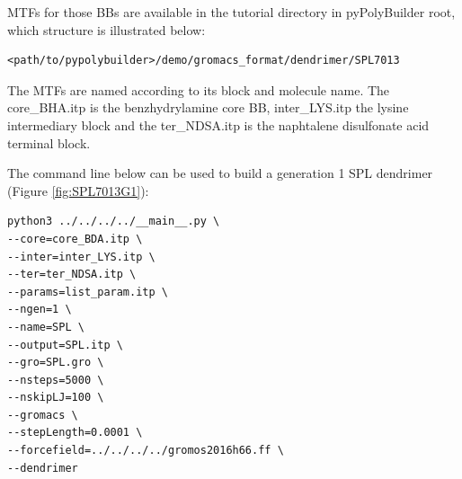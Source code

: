MTFs for those BBs are available in the tutorial directory in pyPolyBuilder root, which structure is illustrated below:
\begin{lstlisting}
<path/to/pypolybuilder>/demo/gromacs_format/dendrimer/SPL7013
\end{lstlisting}

The MTFs are named according to its block and molecule name.
The core\_BHA.itp is the benzhydrylamine core BB, inter\_LYS.itp the lysine intermediary block and the ter\_NDSA.itp is the naphtalene disulfonate acid terminal block.

The command line below can be used to build a generation 1 SPL dendrimer (Figure \ref{fig:SPL7013G1}):

\begin{lstlisting}
python3 ../../../../__main__.py \
--core=core_BDA.itp \
--inter=inter_LYS.itp \
--ter=ter_NDSA.itp \
--params=list_param.itp \
--ngen=1 \
--name=SPL \
--output=SPL.itp \
--gro=SPL.gro \
--nsteps=5000 \
--nskipLJ=100 \
--gromacs \
--stepLength=0.0001 \
--forcefield=../../../../gromos2016h66.ff \
--dendrimer
\end{lstlisting}


